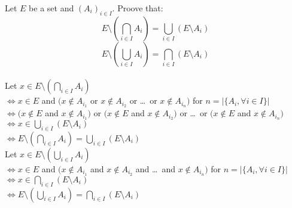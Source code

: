 \documentclass{article}
\begin{document}
\noindent Let $E$ be a set and $(A_i)_{i\in I}$. Proove
that:\\
\[
E \setminus (\bigcap_{i \in I}A_i) =
\bigcup_{i \in I}(E \setminus A_i)
\]
\[
E \setminus (\bigcup_{i \in I}A_i) =
\bigcap_{i \in I}(E \setminus A_i)
\]\\

\noindent Let $x \in E \setminus (\bigcap_{i \in I}A_i)$\\
$\iff x \in E $ and $(x \notin A_{i_1}  $ or
$ x \notin A_{i_2} $ or \dots \ or $ x \notin A_{i_n})$
for $n = |\{A_i, \forall i \in I\}|$\\
$\iff (x \notin E $ and $ x \notin A_{i_1}) $ or
$(x \notin E $ and $ x \notin A_{i_2}) $ or \dots\  or
$(x \notin E $ and $ x \notin A_{i_n})$
$\iff  x \in \bigcup_{i \in I}(E \setminus A_i)$\\
$\iff E \setminus (\bigcap_{i \in I}A_i) =
\bigcup_{i \in I}(E \setminus A_i)$\\


\noindent Let $x \in E \setminus (\bigcup_{i \in I}A_i)$\\
$\iff x \in E $ and $(x \notin A_{i_1}  $ and
$ x \notin A_{i_2} $ and \dots \ and $ x \notin A_{i_n})$
for $n = |\{A_i, \forall i \in I\}|$\\
$\iff x \in \bigcap_{i \in I}(E \setminus A_i)$\\
$\iff E \setminus (\bigcup_{i \in I}A_i) =
\bigcap_{i \in I}(E \setminus A_i)$
\end{document}
